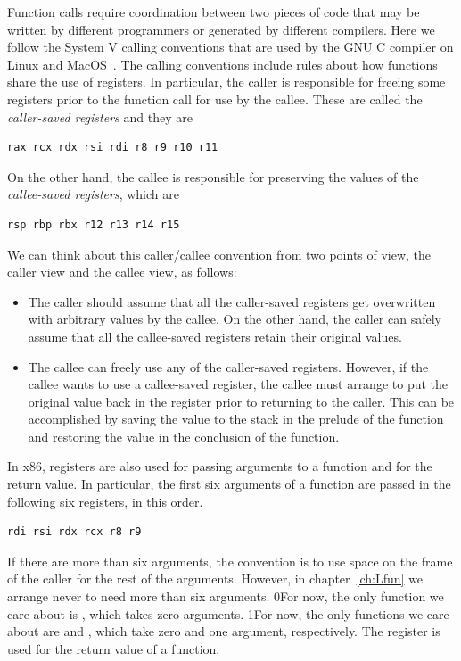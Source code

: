 \documentclass[7x10]{TimesAPriori_MIT}%
\def\racketEd{0}
\def\pythonEd{1}
\def\edition{0}
\newcommand{\racket}[1]{{\if\edition\racketEd{#1}\fi}}
\newcommand{\python}[1]{{\if\edition\pythonEd #1\fi}}
\numberwithin{theorem}{chapter}
\numberwithin{definition}{chapter}
\numberwithin{equation}{chapter}
\begin{document}
Function calls require coordination between two pieces of code that
may be written by different programmers or generated by different
compilers. Here we follow the System V calling conventions that are
used by the GNU C compiler on Linux and
MacOS~\citep{Bryant:2005aa,Matz:2013aa}.
%
The calling conventions include rules about how functions share the
use of registers. In particular, the caller is responsible for freeing
some registers prior to the function call for use by the callee.
These are called the \emph{caller-saved registers}
and they are
\begin{lstlisting}
rax rcx rdx rsi rdi r8 r9 r10 r11
\end{lstlisting}
On the other hand, the callee is responsible for preserving the values
of the \emph{callee-saved registers}, 
which are
\begin{lstlisting}
rsp rbp rbx r12 r13 r14 r15
\end{lstlisting}

We can think about this caller/callee convention from two points of
view, the caller view and the callee view, as follows:
\begin{itemize}
\item The caller should assume that all the caller-saved registers get
  overwritten with arbitrary values by the callee.  On the other hand,
  the caller can safely assume that all the callee-saved registers
  retain their original values.
\item The callee can freely use any of the caller-saved registers.
  However, if the callee wants to use a callee-saved register, the
  callee must arrange to put the original value back in the register
  prior to returning to the caller. This can be accomplished by saving
  the value to the stack in the prelude of the function and restoring
  the value in the conclusion of the function.
\end{itemize}

In x86, registers are also used for passing arguments to a function
and for the return value.  In particular, the first six arguments of a
function are passed in the following six registers, in this order.
\begin{lstlisting}
rdi rsi rdx rcx r8 r9
\end{lstlisting}
If there are more than six arguments, the convention is to use
space on the frame of the caller for the rest of the
arguments. However, in chapter~\ref{ch:Lfun} we arrange never to
need more than six arguments.
%
\racket{For now, the only function we care about is ,
  which takes zero arguments.}
%
\python{For now, the only functions we care about are \code{read\_int}
  and \code{print\_int}, which take zero and one argument, respectively.}
%
The register  is used for the return value of a function.
\end{document}
